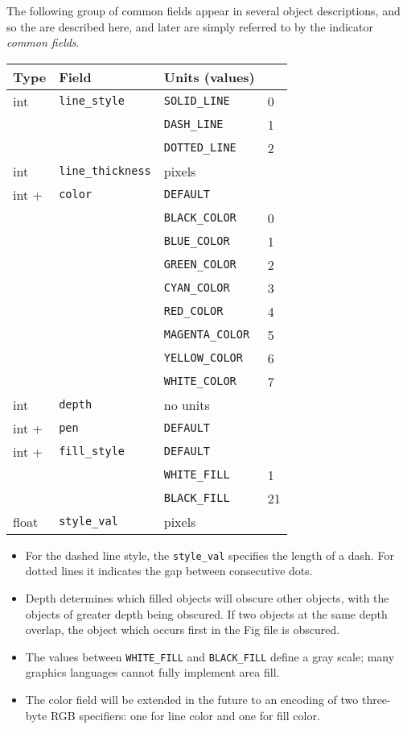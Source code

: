 The following group of common fields appear in several object
	descriptions, and so the are described here, and later are
	simply referred to by the indicator {\it common fields}.
%
\vspace{2pt}
\begin{center}
\begin{tabular} {|l|l|ll|}
\hline
Type	& Field			& Units (values)	&	\\ \hline
\hline
int	& {\tt line\_style}	& {\tt SOLID\_LINE}	& 0	\\
	&			& {\tt DASH\_LINE}	& 1	\\
	&			& {\tt DOTTED\_LINE}	& 2	\\ \hline
%
int	& {\tt line\_thickness}	& pixels		&	\\ \hline
%
int +	& {\tt color}		& {\tt DEFAULT}		&	\\
	&		        & {\tt BLACK\_COLOR}	& 0	\\
	&			& {\tt BLUE\_COLOR}	& 1	\\
	&			& {\tt GREEN\_COLOR}	& 2	\\
	&			& {\tt CYAN\_COLOR}	& 3	\\
	&			& {\tt RED\_COLOR}	& 4	\\
	&			& {\tt MAGENTA\_COLOR}	& 5	\\
	&			& {\tt YELLOW\_COLOR}	& 6	\\
	&			& {\tt WHITE\_COLOR}	& 7	\\ \hline
%
int	& {\tt depth}		& no units		&	\\ \hline
%
int +	& {\tt pen}		& {\tt DEFAULT}		&	\\ \hline
%
int +	& {\tt fill\_style}	& {\tt DEFAULT}		&	\\
	&			& {\tt WHITE\_FILL}	&   1	\\
	&			& {\tt BLACK\_FILL}	&   21	\\ \hline
%
float	& {\tt style\_val}	& pixels		&	\\ \hline
\end{tabular}
\end{center}
\vspace{4pt}

\begin{itemize}
\item For the dashed line style, the {\tt style\_val}	specifies the length of a dash.
For dotted lines it indicates the gap between consecutive dots.

\item Depth determines which filled objects will obscure other objects,
	with the objects of greater depth being obscured.
If two objects at the same depth overlap, the object which occurs first
	in the Fig file is obscured.

\item The values between {\tt WHITE\_FILL} and {\tt BLACK\_FILL} define
	a gray scale; many graphics languages cannot fully implement area fill.

\item The color field will be extended in the future to an encoding of two
	three-byte RGB specifiers: one for line color and one for fill color.
\end{itemize}

